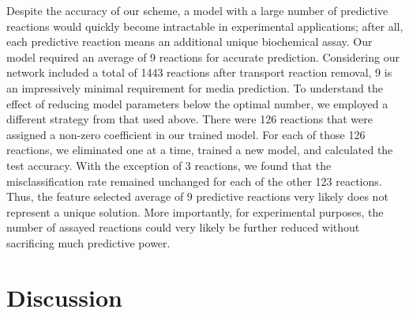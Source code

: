 \documentclass[12pt]{article}
\begin{document}
Despite the accuracy of our scheme, a model with a large number of predictive reactions would quickly become intractable in experimental applications; after all, each predictive reaction means an additional unique biochemical assay. Our model required an average of 9 reactions for accurate prediction. Considering our network included a total of 1443 reactions after transport reaction removal, 9 is an impressively minimal requirement for media prediction. To understand the effect of reducing model parameters below the optimal number, we employed a different strategy from that used above. There were 126 reactions that were assigned a non-zero coefficient in our trained model. For each of those 126 reactions, we eliminated one at a time, trained a new model, and calculated the test accuracy. With the exception of 3 reactions, we found that the misclassification rate remained unchanged for each of the other 123 reactions. Thus, the feature selected average of 9 predictive reactions very likely does not represent a unique solution. More importantly, for experimental purposes, the number of assayed reactions could very likely be further reduced without sacrificing much predictive power.


\section*{Discussion}
\end{document}
